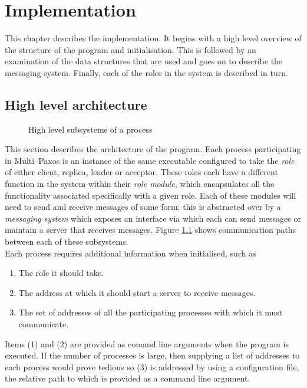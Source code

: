 \chapter{Implementation}

This chapter describes the implementation. It begins with a high level overview of the structure of the program and initialisation. This is followed by an examination of the data structures that are used and goes on to describe the messaging system. Finally, each of the roles in the system is described in turn.

\section{High level architecture}

\begin{figure}
\centering
\scalebox{.7}{}
       \caption{High level subsystems of a process}
       \label{fig:high-level-structure}
  \centering
\end{figure}

This section describes the architecture of the program. Each process participating in Multi--Paxos is an instance of the same executable configured to take the \emph{role} of either client, replica, leader or acceptor. These roles each have a different function in the system within their \emph{role module}, which encapsulates all the functionality associated specifically with a given role. Each of these modules will need to send and receive messages of some form; this is abstracted over by a \emph{messaging system} which exposes an interface via which each can send messages or maintain a server that receives messages. Figure \ref{fig:high-level-structure} shows communication paths between each of these subsystems. \\

Each process requires additional information when initialised, such as 

\begin{enumerate}
  \item The role it should take.
  \item The address at which it should start a server to receive messages.
  \item The set of addresses of all the participating processes with which it must communicate.
\end{enumerate}

Items (1) and (2) are provided as comand line arguments when the program is executed. If the number of processes is large, then supplying a list of addresses to each process would prove tedious so (3) is addressed by using a configuration file, the relative path to which is provided as a command line argument. \\ 

